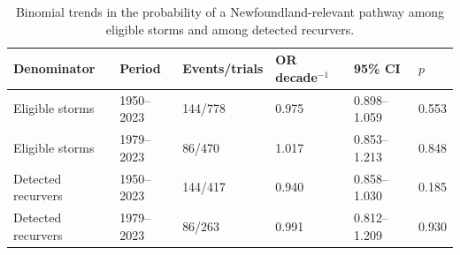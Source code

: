 \begin{table}[htbp]
\caption{Binomial trends in the probability of a Newfoundland-relevant pathway among eligible storms and among detected recurvers.}
\label{tab:pathway_trends}
\begin{tabular}{llllll}
\toprule
Denominator & Period & Events/trials & OR decade$^{-1}$ & 95\% CI & $p$ \\
\midrule
Eligible storms & 1950--2023 & 144/778 & 0.975 & 0.898--1.059 & 0.553 \\
Eligible storms & 1979--2023 & 86/470 & 1.017 & 0.853--1.213 & 0.848 \\
Detected recurvers & 1950--2023 & 144/417 & 0.940 & 0.858--1.030 & 0.185 \\
Detected recurvers & 1979--2023 & 86/263 & 0.991 & 0.812--1.209 & 0.930 \\
\bottomrule
\end{tabular}
\end{table}
